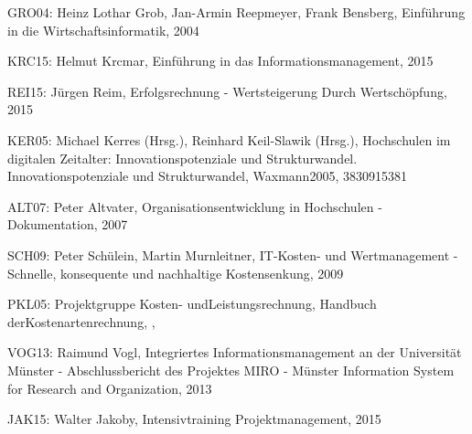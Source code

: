\documentclass[a4paper]{article}
\begin{document}
{\sffamily
GRO04: Heinz Lothar Grob, Jan-Armin Reepmeyer, Frank Bensberg, Einführung in die Wirtschaftsinformatik, 2004}

{\sffamily
KRC15: Helmut Krcmar, Einführung in das Informationsmanagement, 2015}

{\sffamily
REI15: Jürgen Reim, Erfolgsrechnung - Wertsteigerung Durch Wertsch\"{o}pfung, 2015}

{\sffamily
KER05: Michael Kerres (Hrsg.), Reinhard Keil-Slawik (Hrsg.), Hochschulen im digitalen Zeitalter: Innovationspotenziale
und Strukturwandel. Innovationspotenziale und Strukturwandel, Waxmann2005, 3830915381}

{\sffamily
ALT07: Peter Altvater, Organisationsentwicklung in Hochschulen - Dokumentation, 2007}

{\sffamily
SCH09: Peter Schülein, Martin Murnleitner, IT-Kosten- und Wertmanagement -Schnelle, konsequente und nachhaltige
Kostensenkung, 2009}

{\sffamily
PKL05: Projektgruppe Kosten- undLeistungsrechnung, Handbuch derKostenartenrechnung, , }

{\sffamily
VOG13: Raimund Vogl, Integriertes Informationsmanagement an der Universität Münster - Abschlussbericht des Projektes
MIRO - Münster Information System for Research and Organization, 2013}

{\sffamily
JAK15: Walter Jakoby, Intensivtraining Projektmanagement, 2015}

\bigskip
\end{document}
